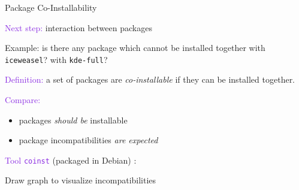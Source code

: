 \documentclass[xcolor={dvipsnames}]{beamer}
\newcommand{\EEE}[1]{\textcolor{BlueViolet}{#1}}
\begin{document}
\begin{frame}[fragile]{Package Co-Installability}

\EEE{Next step:} interaction between packages

\hspace{1cm}\begin{minipage}{\dimexpr\textwidth-2.5cm}
\vspace{0.3em}
Example: is there any package which cannot be installed together with
\texttt{iceweasel}? with \texttt{kde-full}?
\end{minipage}

\vspace{1.5em}

\EEE{Definition:} a set of packages are \emph{co-installable} if they
can be installed together.

\vspace{1.5em}

\EEE{Compare:}
\begin{itemize}
\item packages \emph{should be} installable
\item package incompatibilities \emph{are expected}
\end{itemize}

\vspace{1.5em}

\EEE{Tool \texttt{coinst}} (packaged in Debian) :

\hspace{1cm} Draw graph to visualize incompatibilities

\end{frame}
\end{document}
